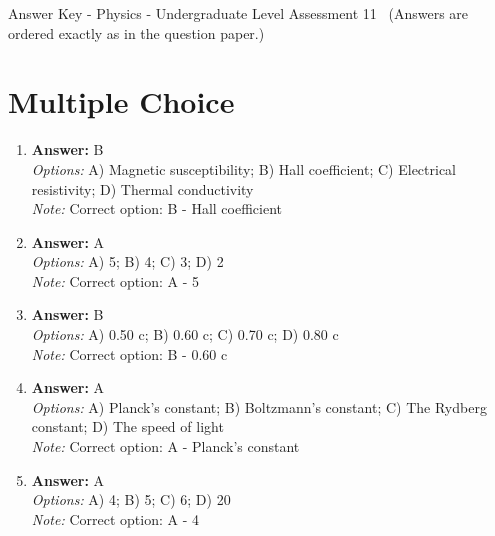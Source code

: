 \documentclass[12pt]{article}
\begin{document}
\begin{center}
Answer Key - Physics - Undergraduate Level Assessment 11 \
\small (Answers are ordered exactly as in the question paper.)
\end{center}

\section*{Multiple Choice}
\begin{enumerate}[label=\arabic*.]
\item \textbf{Answer:} B
\\ \textit{Options:} A) Magnetic susceptibility; B) Hall coefficient; C) Electrical resistivity; D) Thermal conductivity
\\ \textit{Note:} Correct option: B - Hall coefficient
\item \textbf{Answer:} A
\\ \textit{Options:} A) 5; B) 4; C) 3; D) 2
\\ \textit{Note:} Correct option: A - 5
\item \textbf{Answer:} B
\\ \textit{Options:} A) 0.50 c; B) 0.60 c; C) 0.70 c; D) 0.80 c
\\ \textit{Note:} Correct option: B - 0.60 c
\item \textbf{Answer:} A
\\ \textit{Options:} A) Planck's constant; B) Boltzmann's constant; C) The Rydberg constant; D) The speed of light
\\ \textit{Note:} Correct option: A - Planck's constant
\item \textbf{Answer:} A
\\ \textit{Options:} A) 4; B) 5; C) 6; D) 20
\\ \textit{Note:} Correct option: A - 4
\end{enumerate}
\end{document}
